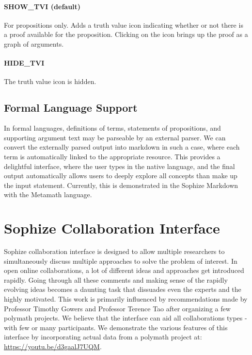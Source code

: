 \documentclass[a4paper]{article}
\begin{document}
\paragraph{SHOW\_TVI (default)}

For propositions only. Adds a truth value icon indicating whether or not there is a proof available for the proposition. Clicking on the icon brings up the proof as a graph of arguments.


\paragraph{HIDE\_TVI}

The truth value icon is hidden.


\subsection{Formal Language Support}

In formal languages, definitions of terms, statements of propositions, and supporting argument text may be parseable by an external parser. We can convert the externally parsed output into markdown in such a case, where each term is automatically linked to the appropriate resource. This provides a delightful interface, where the user types in the native language, and the final output automatically allows users to deeply explore all concepts than make up the input statement. Currently, this is demonstrated in the Sophize Markdown with the Metamath language.


\section{Sophize Collaboration Interface}

Sophize collaboration interface is designed to allow multiple researchers to simultaneously discuss multiple approaches to solve the problem of interest. In open online collaborations, a lot of different ideas and approaches get introduced rapidly. Going through all these comments and making sense of the rapidly evolving ideas becomes a daunting task that dissuades even the experts and the highly motivated. This work is primarily influenced by recommendations made by Professor Timothy Gowers and Professor Terence Tao after organizing a few polymath projects. We believe that the interface can aid all collaborations types - with few or many participants. We demonstrate the various features of this interface by incorporating actual data from a polymath project at: \url{https://youtu.be/d3gaalJ7UQM}.
\end{document}
